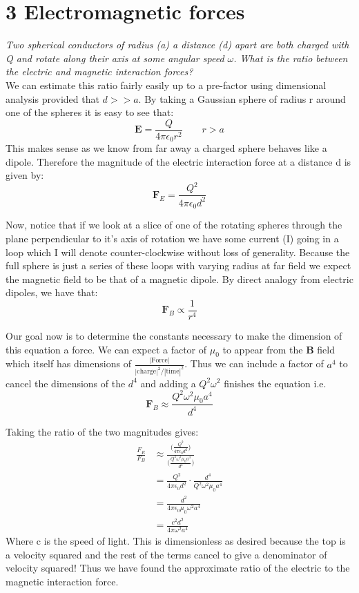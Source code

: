 \documentclass[a4paper, 11pt]{article}
\begin{document}
\section*{3 Electromagnetic forces}	
\textit{Two spherical conductors of radius (a) a distance (d) apart are both charged with Q and rotate along their axis at some angular speed $\omega$. What is the ratio between the electric and magnetic interaction forces?}\\ 

\noindent We can estimate this ratio fairly easily up to a pre-factor using dimensional analysis provided that $d >> a$. By taking a Gaussian sphere of radius r around one of the spheres it is easy to see that: 	
	\begin{equation*}
		\mathbf{E} = \frac{Q}{4\pi\epsilon_0 r^2} \quad \quad r>a 
	\end{equation*}
This makes sense as we know from far away a charged sphere behaves like a dipole. Therefore the magnitude of the electric interaction force at a distance d is given by: 
	\begin{equation}
		\mathbf{F}_E = \frac{Q^2}{4\pi\epsilon_0 d^2}
	\end{equation}
	
Now, notice that if we look at a slice of one of the rotating spheres through the plane perpendicular to it's axis of rotation we have some current (I) going in a loop which I will denote counter-clockwise without loss of generality. Because the full sphere is just a series of these loops with varying radius at far field we expect the magnetic field to be that of a magnetic dipole. By direct analogy from electric dipoles, we have that: 
	\begin{equation*}
		\mathbf{F}_B \propto \frac{1}{r^4}
	\end{equation*}
	
Our goal now is to determine the constants necessary to make the dimension of this equation a force. We can expect a factor of $\mu_0$ to appear from the \textbf{B} field which itself has dimensions of $\frac{|\text{Force}|}{|\text{charge}|^2/|\text{time}|^2}$. Thus we can include a factor of $a^4$ to cancel the dimensions of the $d^4$ and adding a $Q^2\omega^2$ finishes the equation i.e. 
	\begin{equation*}
		\mathbf{F}_B \approx \frac{Q^2\omega^2\mu_0 a^4}{d^4}
	\end{equation*}
	
Taking the ratio of the two  magnitudes gives: 
	\begin{align*}
		\frac{F_E}{F_B} &\approx \frac{\Bigg(\frac{Q^2}{4\pi\epsilon_0 d^2}\Bigg)}{\Bigg(\frac{Q^2\omega^2\mu_0 a^4}{d^4}\Bigg)} \\
		&= \frac{Q^2}{4\pi\epsilon_0 d^2} \cdot \frac{d^4}{Q^2\omega^2\mu_0 a^4} \\ 
		&= \frac{d^2}{4\pi\epsilon_0\mu_0\omega^2a^4} \\ 
		&= \frac{c^2d^2}{4\pi\omega^2a^4}
	\end{align*}
Where c is the speed of light. This is dimensionless as desired because the top is a velocity squared and the rest of the terms cancel to give a denominator of velocity squared! Thus we have found the approximate ratio of the electric to the magnetic interaction force. 
\end{document}
